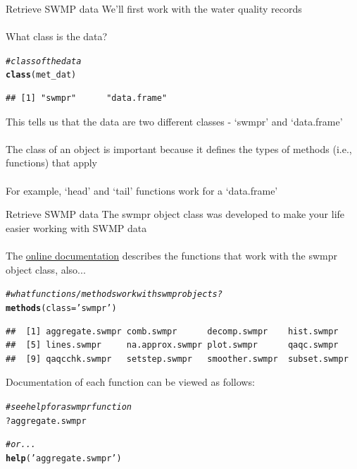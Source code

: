 \documentclass[xcolor=svgnames]{beamer}\usepackage[]{graphicx}\usepackage[]{color}
\makeatletter
\newcommand{\hlstr}[1]{\textcolor[rgb]{0.192,0.494,0.8}{#1}}%
\newcommand{\hlcom}[1]{\textcolor[rgb]{0.678,0.584,0.686}{\textit{#1}}}%
\newcommand{\hlopt}[1]{\textcolor[rgb]{0,0,0}{#1}}%
\newcommand{\hlstd}[1]{\textcolor[rgb]{0.345,0.345,0.345}{#1}}%
\newcommand{\hlkwc}[1]{\textcolor[rgb]{0.333,0.667,0.333}{#1}}%
\newcommand{\hlkwd}[1]{\textcolor[rgb]{0.737,0.353,0.396}{\textbf{#1}}}%
\newenvironment{kframe}{%
 \def\at@end@of@kframe{}%
 \ifinner\ifhmode%
  \def\at@end@of@kframe{\end{minipage}}%
  \begin{minipage}{\columnwidth}%
 \fi\fi%
 \def\FrameCommand##1{\hskip\@totalleftmargin \hskip-\fboxsep
 \colorbox{shadecolor}{##1}\hskip-\fboxsep
     \hskip-\linewidth \hskip-\@totalleftmargin \hskip\columnwidth}%
 \MakeFramed {\advance\hsize-\width
   \@totalleftmargin\z@ \linewidth\hsize
   \@setminipage}}%
 {\par\unskip\endMakeFramed%
 \at@end@of@kframe}
\newenvironment{knitrout}{}{} %
\makeatother
\begin{document}
\begin{frame}{Retrieve SWMP data}
We'll first work with the water quality records\\~\\
What class is the data?
\begin{knitrout}\scriptsize
{}\color{fgcolor}\begin{kframe}
\begin{alltt}
\hlcom{# class of the data}
\hlkwd{class}\hlstd{(met_dat)}
\end{alltt}
\begin{verbatim}
## [1] "swmpr"      "data.frame"
\end{verbatim}
\end{kframe}
\end{knitrout}
This tells us that the data are two different classes - `swmpr' and `data.frame'\\~\\
The class of an object is important because it defines the types of methods (i.e., functions) that apply\\~\\
For example, `head' and `tail' functions work for a `data.frame'
\end{frame}

\begin{frame}{Retrieve SWMP data}
The swmpr object class was developed to make your life easier working with SWMP data\\~\\
The \href{https://github.com/fawda123/SWMPr}{online documentation} describes the functions that work with the swmpr object class, also...
\begin{knitrout}\scriptsize
{}\color{fgcolor}\begin{kframe}
\begin{alltt}
\hlcom{# what functions/methods work with swmpr objects?}
\hlkwd{methods}\hlstd{(}\hlkwc{class} \hlstd{=} \hlstr{'swmpr'}\hlstd{)}
\end{alltt}
\begin{verbatim}
##  [1] aggregate.swmpr comb.swmpr      decomp.swmpr    hist.swmpr     
##  [5] lines.swmpr     na.approx.swmpr plot.swmpr      qaqc.swmpr     
##  [9] qaqcchk.swmpr   setstep.swmpr   smoother.swmpr  subset.swmpr
\end{verbatim}
\end{kframe}
\end{knitrout}
Documentation of each function can be viewed as follows:
\begin{knitrout}\scriptsize
{}\color{fgcolor}\begin{kframe}
\begin{alltt}
\hlcom{# see help for a swmpr function}
\hlopt{?}\hlstd{aggregate.swmpr}

\hlcom{# or...}
\hlkwd{help}\hlstd{(}\hlstr{'aggregate.swmpr'}\hlstd{)}
\end{alltt}
\end{kframe}
\end{knitrout}
\end{frame}
\end{document}
